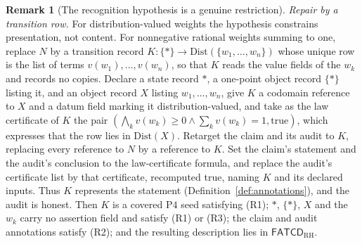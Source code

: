 \documentclass[11pt]{article}
\theoremstyle{definition}
\newtheorem{remark}[theorem]{Remark}
\newcommand{\FATCD}{\ensuremath{\mathsf{FATCD}}}
\newcommand{\Pfour}{\ensuremath{\mathrm{P4}}}
\begin{document}
\begin{remark}[The recognition hypothesis is a genuine restriction]
\emph{Repair by a transition row.} For distribution-valued weights the hypothesis constrains presentation, not content. For nonnegative
rational weights summing to one, replace \(N\) by a transition record
\(K:\{*\}\to\mathrm{Dist}(\{w_1,\ldots,w_n\})\) whose unique row is the list
of terms \(v(w_1),\dots,v(w_n)\), so that \(K\) reads the value fields of the
\(w_k\) and records no copies. Declare a state record \(*\), a one-point object record \(\{*\}\) listing it, and an
object record \(X\) listing \(w_1,\dots,w_n\), give \(K\) a codomain reference to
\(X\) and a datum field marking it distribution-valued, and take as the law certificate
of \(K\) the pair \((\bigwedge_k v(w_k)\ge0\wedge\sum_k v(w_k)=1,\mathrm{true})\),
which expresses that the row lies in \(\mathrm{Dist}(X)\). Retarget the claim and its audit to \(K\), replacing every reference
to \(N\) by a reference to \(K\). Set the claim's statement and the
audit's conclusion to the law-certificate formula, and replace the
audit's certificate list by that certificate, recomputed true,
naming \(K\) and its declared inputs. Thus \(K\) represents the
statement (Definition~\ref{def:annotations}), and the audit is honest. Then \(K\) is a covered \Pfour{} seed
satisfying (R1); \(*\), \(\{*\}\), \(X\) and the \(w_k\) carry no assertion field and
satisfy (R1) or (R3); the claim and audit annotations satisfy (R2); and the
resulting description lies in \(\FATCD_{\mathrm{RH}}\).


\end{remark}
\end{document}
